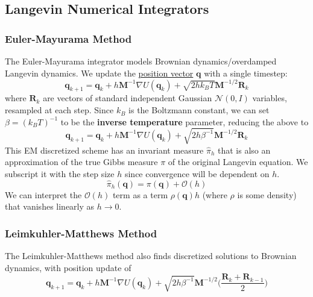  \subsection{Langevin Numerical Integrators}

    \subsubsection{Euler-Mayurama Method}

      The Euler-Mayurama integrator models Brownian dynamics/overdamped Langevin dynamics. We update the \hyperref[alg-def:position-vector]{position vector} $\mathbf{q}$ with a single timestep: 
      \begin{equation}
        \mathbf{q}_{k+1} = \mathbf{q}_k + h \mathbf{M}^{-1} \nabla U(\mathbf{q}_k) + \sqrt{2 h k_B T} \mathbf{M}^{-1/2} \mathbf{R}_k
      \end{equation}
      where $\mathbf{R}_k$ are vectors of standard independent Gaussian $\mathcal{N}(0, I)$ variables, resampled at each step. Since $k_B$ is the Boltzmann constant, we can set $\beta = (k_B T)^{-1}$ to be the \textbf{inverse temperature} parameter, reducing the above to 
      \begin{equation}
        \mathbf{q}_{k+1} = \mathbf{q}_k + h \mathbf{M}^{-1} \nabla U(\mathbf{q}_k) + \sqrt{2 h \beta^{-1}} \mathbf{M}^{-1/2} \mathbf{R}_k
      \end{equation}
      This EM discretized scheme has an invariant measure $\hat{\pi}_h$ that is also an approximation of the true Gibbs measure $\pi$ of the original Langevin equation. We subscript it with the step size $h$ since convergence will be dependent on $h$. 
      \begin{equation}
        \hat{\pi}_h (\mathbf{q}) = \pi(\mathbf{q}) + \mathcal{O}(h)
      \end{equation}
      We can interpret the $\mathcal{O}(h)$ term as a term $\rho(\mathbf{q}) h$ (where $\rho$ is some density) that vanishes linearly as $h \rightarrow 0$. 

    \subsubsection{Leimkuhler-Matthews Method}

      The Leimkuhler-Matthews method also finds discretized solutions to Brownian dynamics, with position update of 
      \begin{equation}
        \mathbf{q}_{k+1} = \mathbf{q}_k + h \mathbf{M}^{-1} \nabla U(\mathbf{q}_k) + \sqrt{2 h \beta^{-1}} \mathbf{M}^{-1/2} \bigg( \frac{\mathbf{R}_k + \mathbf{R}_{k-1}}{2} \bigg)
      \end{equation}

